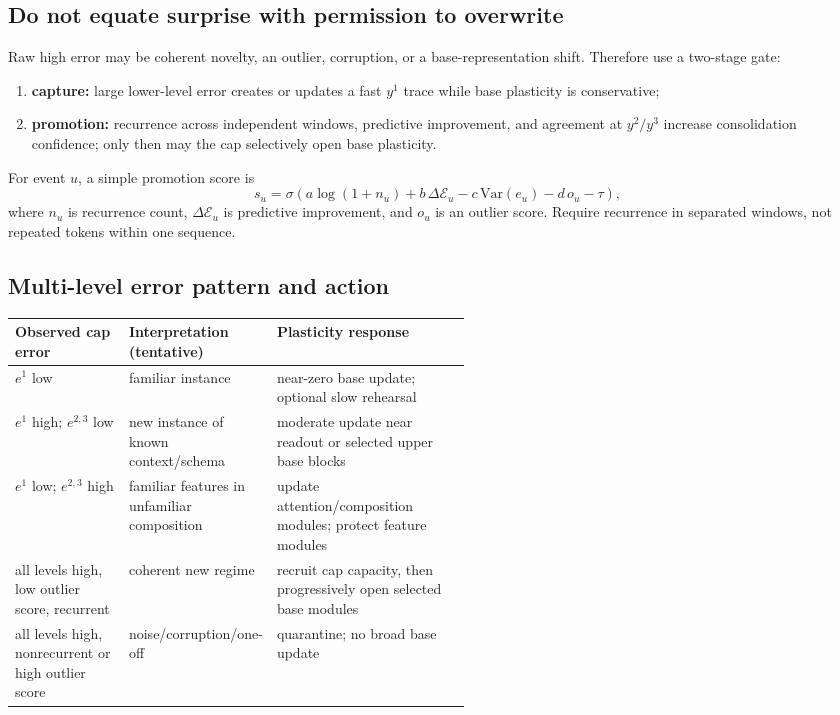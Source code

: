 \documentclass[10pt]{article}
\begin{document}
\subsection{Do not equate surprise with permission to overwrite}
Raw high error may be coherent novelty, an outlier, corruption, or a base-representation
shift.  Therefore use a two-stage gate:
\begin{enumerate}
  \item \textbf{capture:} large lower-level error creates or updates a fast $y^1$ trace while
  base plasticity is conservative;
  \item \textbf{promotion:} recurrence across independent windows, predictive improvement,
  and agreement at $y^2/y^3$ increase consolidation confidence; only then may the cap
  selectively open base plasticity.
\end{enumerate}
For event $u$, a simple promotion score is
\[
s_u=\sigma\!\left(a\log(1+n_u)+b\,\Delta\mathcal E_u
-c\,\mathrm{Var}(e_u)-d\,o_u-\tau\right),
\]
where $n_u$ is recurrence count, $\Delta\mathcal E_u$ is predictive improvement, and $o_u$
is an outlier score.  Require recurrence in separated windows, not repeated tokens within one
sequence.

\subsection{Multi-level error pattern and action}
\begin{center}
\begin{tabularx}{0.98\linewidth}{p{0.25\linewidth} p{0.28\linewidth} X}
\toprule
Observed cap error & Interpretation (tentative) & Plasticity response\\
\midrule
$e^1$ low & familiar instance & near-zero base update; optional slow rehearsal\\
$e^1$ high; $e^{2,3}$ low & new instance of known context/schema & moderate update near readout or selected upper base blocks\\
$e^1$ low; $e^{2,3}$ high & familiar features in unfamiliar composition & update attention/composition modules; protect feature modules\\
all levels high, low outlier score, recurrent & coherent new regime & recruit cap capacity, then progressively open selected base modules\\
all levels high, nonrecurrent or high outlier score & noise/corruption/one-off & quarantine; no broad base update\\
\bottomrule
\end{tabularx}
\end{center}
\end{document}
